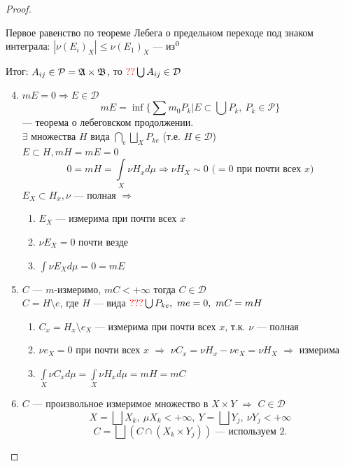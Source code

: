 \documentclass[oneside]{book}
\theoremstyle{plain}
\theoremstyle{remark}
\theoremstyle{definition}
\begin{document}
\begin{proof}
\begin{enumerate}
\begin{enumerate}
Первое равенство по теореме Лебега о предельном переходе под знаком интеграла: \(|\nu (E_i)_X| \le \nu (E_1)_X\) --- из\(\footnotemark[\value{footnote}]\)
\end{enumerate}
\end{enumerate}
Итог: \(A_{ij} \in \mathcal{P} = \mathfrak{A} \times \mathfrak{B}\), то \(\color{red}??\color{black}\bigcup A_{ij} \in \mathcal{D}\)
\begin{enumerate}
\setcounter{enumi}{3}
\item \(mE = 0 \Rightarrow E \in \mathcal{D}\)
\[ mE = \inf\{\sum m_0 P_k | E \subset \bigcup P_k,\ P_k \in \mathcal{P}\} \]
--- теорема о лебеговском продолжении. \\
\(\exists\) множества \(H\) вида \(\bigcap\limits_e\bigsqcup\limits_X P_{ke}\) (т.е. \(H \in \mathcal{D}\)) \\
\(E \subset H, mH = mE = 0\)
\[ 0 = mH = \int\limits_X \nu H_x d\mu \Rightarrow \nu H_X \sim 0\text{ (\(=0\) при почти всех \(x\))} \]
\(E_X \subset H_x, \nu\) --- полная \(\Rightarrow\)
\begin{enumerate}
\item \(E_X\) --- измерима при почти всех \(x\)
\item \(\nu E_X = 0\) почти везде
\item \(\int \nu E_X d\mu = 0 = m E\)
\end{enumerate}
\item \(C\) --- \(m\)-измеримо, \(mC < + \infty\) тогда \(C \in \mathcal{D}\) \\
\(C = H \setminus e\), где \(H\) --- вида \(\color{red}???\color{black}\bigcup P_{ke},\ me = 0,\ mC = mH\)
\begin{enumerate}
\item \(C_x = H_x \setminus e_X\) --- измерима при почти всех \(x\), т.к. \(\nu\) --- полная
\item \(\nu e_X = 0\) при почти всех \(x\) \(\Rightarrow\) \(\nu C_x = \nu H_x - \nu e_X = \nu H_X\) \(\Rightarrow\) измерима
\item \(\int\limits_X \nu C_x d\mu = \int\limits_X \nu H_x d\mu = mH = mC\)
\end{enumerate}
\item \(C\) --- произвольное измеримое множество в \(X \times Y\) \(\Rightarrow\) \(C \in \mathcal{D}\) \\
\[ X = \bigsqcup X_k,\ \mu X_k < + \infty,\ Y = \bigsqcup Y_j,\ \nu Y_j < + \infty \]
\[ C = \bigsqcup (C \cap (X_k \times Y_j))\text{ --- используем 2.}\]
\end{enumerate}
\end{proof}
\end{document}
